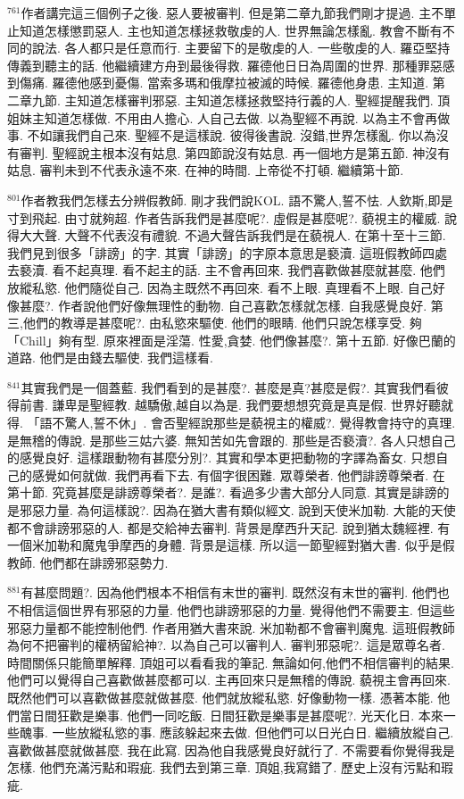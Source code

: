 \documentclass{book}
\begin{document}
$^{761}$作者講完這三個例子之後.
惡人要被審判.
但是第二章九節我們剛才提過.
主不單止知道怎樣懲罰惡人.
主也知道怎樣拯救敬虔的人.
世界無論怎樣亂.
教會不斷有不同的說法.
各人都只是任意而行.
主要留下的是敬虔的人.
一些敬虔的人.
羅亞堅持傳義到聽主的話.
他繼續建方舟到最後得救.
羅德他日日為周圍的世界.
那種罪惡感到傷痛.
羅德他感到憂傷.
當索多瑪和俄摩拉被滅的時候.
羅德他身患.
主知道.
第二章九節.
主知道怎樣審判邪惡.
主知道怎樣拯救堅持行義的人.
聖經提醒我們.
頂姐妹主知道怎樣做.
不用由人擔心.
人自己去做.
以為聖經不再說.
以為主不會再做事.
不如讓我們自己來.
聖經不是這樣說.
彼得後書說.
沒錯,世界怎樣亂.
你以為沒有審判.
聖經說主根本沒有姑息.
第四節說沒有姑息.
再一個地方是第五節.
神沒有姑息.
審判未到不代表永遠不來.
在神的時間.
上帝從不打頓.
繼續第十節.

$^{801}$作者教我們怎樣去分辨假教師.
剛才我們說KOL.
語不驚人,誓不怯.
人欽斯,即是寸到飛起.
由寸就夠超.
作者告訴我們是甚麼呢?.
虛假是甚麼呢?.
藐視主的權威.
說得大大聲.
大聲不代表沒有禮貌.
不過大聲告訴我們是在藐視人.
在第十至十三節.
我們見到很多「誹謗」的字.
其實「誹謗」的字原本意思是褻瀆.
這班假教師四處去褻瀆.
看不起真理.
看不起主的話.
主不會再回來.
我們喜歡做甚麼就甚麼.
他們放縱私慾.
他們隨從自己.
因為主既然不再回來.
看不上眼.
真理看不上眼.
自己好像甚麼?.
作者說他們好像無理性的動物.
自己喜歡怎樣就怎樣.
自我感覺良好.
第三,他們的教導是甚麼呢?.
由私慾來驅使.
他們的眼睛.
他們只說怎樣享受.
夠「Chill」夠有型.
原來裡面是淫蕩.
性愛,貪婪.
他們像甚麼?.
第十五節.
好像巴蘭的道路.
他們是由錢去驅使.
我們這樣看.

$^{841}$其實我們是一個蓋藍.
我們看到的是甚麼?.
甚麼是真?甚麼是假?.
其實我們看彼得前書.
謙卑是聖經教.
越驕傲,越自以為是.
我們要想想究竟是真是假.
世界好聽就得.
「語不驚人,誓不休」.
會否聖經說那些是藐視主的權威?.
覺得教會持守的真理.
是無稽的傳說.
是那些三姑六婆.
無知苦如先會跟的.
那些是否褻瀆?.
各人只想自己的感覺良好.
這樣跟動物有甚麼分別?.
其實和學本更把動物的字譯為畜女.
只想自己的感覺如何就做.
我們再看下去.
有個字很困難.
眾尊榮者.
他們誹謗尊榮者.
在第十節.
究竟甚麼是誹謗尊榮者?.
是誰?.
看過多少書大部分人同意.
其實是誹謗的是邪惡力量.
為何這樣說?.
因為在猶大書有類似經文.
說到天使米加勒.
大能的天使都不會誹謗邪惡的人.
都是交給神去審判.
背景是摩西升天記.
說到猶太魏經裡.
有一個米加勒和魔鬼爭摩西的身體.
背景是這樣.
所以這一節聖經對猶大書.
似乎是假教師.
他們都在誹謗邪惡勢力.

$^{881}$有甚麼問題?.
因為他們根本不相信有末世的審判.
既然沒有末世的審判.
他們也不相信這個世界有邪惡的力量.
他們也誹謗邪惡的力量.
覺得他們不需要主.
但這些邪惡力量都不能控制他們.
作者用猶大書來說.
米加勒都不會審判魔鬼.
這班假教師為何不把審判的權柄留給神?.
以為自己可以審判人.
審判邪惡呢?.
這是眾尊名者.
時間關係只能簡單解釋.
頂姐可以看看我的筆記.
無論如何,他們不相信審判的結果.
他們可以覺得自己喜歡做甚麼都可以.
主再回來只是無稽的傳說.
藐視主會再回來.
既然他們可以喜歡做甚麼就做甚麼.
他們就放縱私慾.
好像動物一樣.
憑著本能.
他們當日間狂歡是樂事.
他們一同吃飯.
日間狂歡是樂事是甚麼呢?.
光天化日.
本來一些醜事.
一些放縱私慾的事.
應該躲起來去做.
但他們可以日光白日.
繼續放縱自己.
喜歡做甚麼就做甚麼.
我在此寫.
因為他自我感覺良好就行了.
不需要看你覺得我是怎樣.
他們充滿污點和瑕疵.
我們去到第三章.
頂姐,我寫錯了.
歷史上沒有污點和瑕疵.
\end{document}
